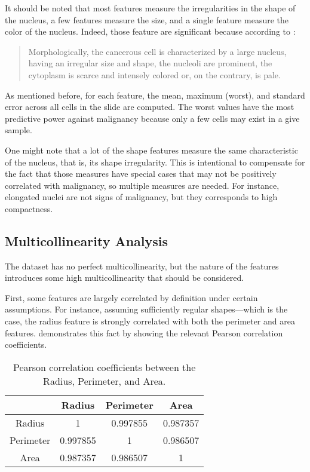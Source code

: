 \documentclass[twocolumn]{article}
\begin{document}
It should be noted that most features measure the irregularities in the shape
of the nucleus, a few features measure the size, and a single feature measure
the color of the nucleus. Indeed, those feature are significant because
according to \autocite{Baba2007}:

\blockquote{ Morphologically, the cancerous cell is characterized by a large
nucleus, having an irregular size and shape, the nucleoli are prominent, the
cytoplasm is scarce and intensely colored or, on the contrary, is pale. }

As mentioned before, for each feature, the mean, maximum (worst), and standard
error across all cells in the slide are computed. The worst values have the most
predictive power against malignancy because only a few cells may exist in a give
sample.

One might note that a lot of the shape features measure the same characteristic
of the nucleus, that is, its shape irregularity. This is intentional to
compensate for the fact that those measures have special cases that may not be
positively correlated with malignancy, so multiple measures are needed. For
instance, elongated nuclei are not signs of malignancy, but they corresponds to
high compactness.

\subsection{Multicollinearity Analysis}

The dataset has no perfect multicollinearity, but the nature of the features
introduces some high multicollinearity that should be considered.

First, some features are largely correlated by definition under certain
assumptions. For instance, assuming sufficiently regular shapes---which is the
case, the radius feature is strongly correlated with both the perimeter and area
features.  demonstrates this fact by
showing the relevant Pearson correlation coefficients.

\begin{table}
\begin{center}
\begin{tabular}{cccc}
\toprule
 & Radius & Perimeter & Area \\
\midrule
Radius & 1 & 0.997855 & 0.987357 \\
Perimeter & 0.997855 & 1 & 0.986507 \\
Area & 0.987357 & 0.986507 & 1 \\
\bottomrule
\end{tabular}
\end{center}
\caption{Pearson correlation coefficients between the Radius, Perimeter, and
  Area.}
\label{tab:RadiusPerimeterAreaCorrelation}
\end{table}
\end{document}
